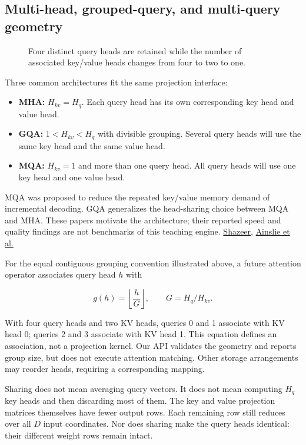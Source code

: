 \documentclass[
  10pt,
]{article}
\providecommand{\tightlist}{%
  \setlength{\itemsep}{0pt}\setlength{\parskip}{0pt}}
\begin{document}
\subsection{Multi-head, grouped-query, and multi-query
geometry}\label{multi-head-grouped-query-and-multi-query-geometry}

\begin{figure}[H]\centering\resizebox{\linewidth}{!}{}\caption{Four distinct query heads are retained while the number of associated key/value heads changes from four to two to one.}\end{figure}

Three common architectures fit the same projection interface:

\begin{itemize}
\tightlist
\item
  \textbf{MHA:} \(H_{kv}=H_q\). Each query head has its own
  corresponding key head and value head.
\item
  \textbf{GQA:} \(1<H_{kv}<H_q\) with divisible grouping. Several query
  heads will use the same key head and the same value head.
\item
  \textbf{MQA:} \(H_{kv}=1\) and more than one query head. All query
  heads will use one key head and one value head.
\end{itemize}

MQA was proposed to reduce the repeated key/value memory demand of
incremental decoding. GQA generalizes the head-sharing choice between
MQA and MHA. These papers motivate the architecture; their reported
speed and quality findings are not benchmarks of this teaching engine.
\href{https://arxiv.org/abs/1911.02150}{Shazeer},
\href{https://arxiv.org/abs/2305.13245}{Ainslie et al.}

For the equal contiguous grouping convention illustrated above, a future
attention operator associates query head \(h\) with

\[
g(h)=\left\lfloor\frac{h}{G}\right\rfloor,
\qquad G=H_q/H_{kv}.
\]

With four query heads and two KV heads, queries 0 and 1 associate with
KV head 0; queries 2 and 3 associate with KV head 1. This equation
defines an association, not a projection kernel. Our API validates the
geometry and reports group size, but does not execute attention
matching. Other storage arrangements may reorder heads, requiring a
corresponding mapping.

Sharing does not mean averaging query vectors. It does not mean
computing \(H_q\) key heads and then discarding most of them. The key
and value projection matrices themselves have fewer output rows. Each
remaining row still reduces over all \(D\) input coordinates. Nor does
sharing make the query heads identical: their different weight rows
remain intact.
\end{document}
